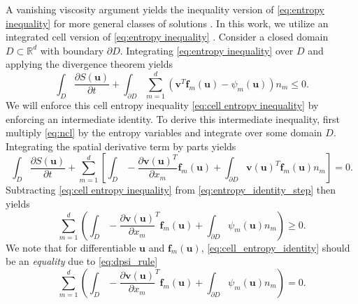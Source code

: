 \documentclass{elsarticle}
\theoremstyle{definition}
\theoremstyle{plain}
\theoremstyle{plain}
\newcommand{\pd}[2]{\frac{\partial#1}{\partial#2}}
\newcommand{\LRp}[1]{\left( #1 \right)} %
\newcommand{\LRs}[1]{\left[ #1 \right]} %
\begin{document}
A vanishing viscosity argument yields the inequality version of \eqref{eq:entropy inequality} for more general classes of solutions \cite{chen2017entropy, dafermos2005hyperbolic, godlewski2013numerical}. In this work, we utilize an integrated cell version of \eqref{eq:entropy inequality} \cite{jiang1994cell}. Consider a closed domain $D \subset \mathbb{R}^d$ with boundary $\partial D$. Integrating \eqref{eq:entropy inequality} over $D$ and applying the divergence theorem yields
\begin{equation}\label{eq:cell entropy inequality}
    \int_D \frac{\partial S(\bm{u})}{\partial t} + \int_{\partial D} \sum_{m=1}^d (\bm{v}^T\bm{f}_m(\bm{u}) - \psi_m(\bm{u}))n_m \leq 0.
\end{equation}
We will enforce this cell entropy inequality \eqref{eq:cell entropy inequality} by enforcing an intermediate identity. To derive this intermediate inequality, first multiply \eqref{eq:ncl} by the entropy variables and integrate over some domain $D$. Integrating the spatial derivative term by parts yields
\begin{equation}
\int_{D} \pd{S(\bm{u})}{t} + \sum_{m=1}^d \LRs{\int_{D} -\pd{\bm{v}(\bm{u})^T}{x_m} \bm{f}_m(\bm{u}) + \int_{\partial D} \bm{v}(\bm{u})^T\bm{f}_m(\bm{u}) n_m} = 0.
\label{eq:entropy_identity_step}
\end{equation}
Subtracting \eqref{eq:cell entropy inequality} from \eqref{eq:entropy_identity_step} then yields
\begin{equation}
\sum_{m=1}^d \LRp{\int_{D}-\pd{\bm{v}(\bm{u})}{x_m}^T\bm{f}_m(\bm{u}) + \int_{\partial D} \psi_m(\bm{u}) n_m} \geq 0.
\label{eq:cell_entropy_identity}
\end{equation}
We note that for differentiable $\bm{u}$ and $\bm{f}_m(\bm{u})$, \eqref{eq:cell_entropy_identity} should be an \textit{equality} due to \eqref{eq:dpsi_rule}
\begin{equation}
\sum_{m=1}^d\LRp{\int_{D}-\pd{\bm{v}(\bm{u})}{x_m}^T\bm{f}_m(\bm{u}) + \int_{\partial D} \psi_m(\bm{u}) n_m} = 0.
\label{eq:cell_entropy_equality}
\end{equation}
\end{document}
